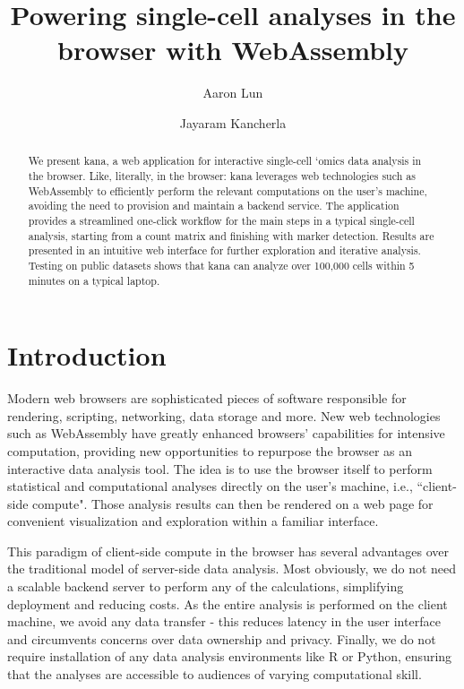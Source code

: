 \documentclass{article}
\title{Powering single-cell analyses in the browser with WebAssembly}
\author[1,*,!]{Aaron Lun}
\affil[1]{Genentech, Inc. South San Francisco, CA}
\affil[*]{Authors contributed equally to this work.}
\affil[!]{Corresponding author at luna@gene.com}
\author[1,*]{Jayaram Kancherla}
\begin{document}
\maketitle

\begin{abstract}
We present kana, a web application for interactive single-cell `omics data analysis in the browser.
Like, literally, in the browser:
kana leverages web technologies such as WebAssembly to efficiently perform the relevant computations on the user's machine,
avoiding the need to provision and maintain a backend service. 
The application provides a streamlined one-click workflow for the main steps in a typical single-cell analysis, 
starting from a count matrix and finishing with marker detection.
Results are presented in an intuitive web interface for further exploration and iterative analysis. 
Testing on public datasets shows that kana can analyze over 100,000 cells within 5 minutes on a typical laptop.
\end{abstract}

\section{Introduction}

Modern web browsers are sophisticated pieces of software responsible for rendering, scripting, networking, data storage and more.
New web technologies such as WebAssembly \cite{haas2017bringing} have greatly enhanced browsers' capabilities for intensive computation,
providing new opportunities to repurpose the browser as an interactive data analysis tool.
The idea is to use the browser itself to perform statistical and computational analyses directly on the user's machine, i.e., ``client-side compute". 
Those analysis results can then be rendered on a web page for convenient visualization and exploration within a familiar interface.

This paradigm of client-side compute in the browser has several advantages over the traditional model of server-side data analysis.
Most obviously, we do not need a scalable backend server to perform any of the calculations, simplifying deployment and reducing costs.
As the entire analysis is performed on the client machine, we avoid any data transfer - this reduces latency in the user interface and circumvents concerns over data ownership and privacy.
Finally, we do not require installation of any data analysis environments like R or Python, ensuring that the analyses are accessible to audiences of varying computational skill.
\end{document}
